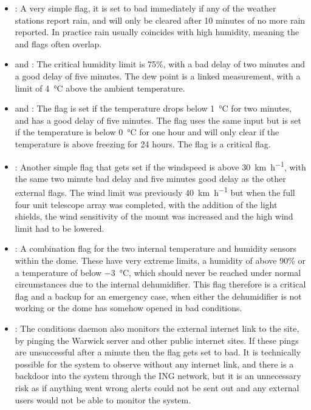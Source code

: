 \begin{colsection}
\begin{colsection}
\begin{itemize}
\item {}: A very simple flag, it is set to bad immediately if any of the weather stations report rain, and will only be cleared after 10 minutes of no more rain reported. In practice rain usually coincides with high humidity, meaning the  and  flags often overlap.

\item {} and : The critical humidity limit is 75\%, with a bad delay of two minutes and a good delay of five minutes. The dew point is a linked measurement, with a limit of \SI{4}{\celsius} above the ambient temperature.

\item {} and : The  flag is set if the temperature drops below \SI{1}{\celsius} for two minutes, and has a good delay of five minutes. The  flag uses the same input but is set if the temperature is below \SI{0}{\celsius} for one hour and will only clear if the temperature is above freezing for 24 hours. The  flag is a critical flag.

\item {}: Another simple flag that gets set if the windspeed is above \SI{30}{\kilo\meter\per\hour}, with the same two minute bad delay and five minutes good delay as the other external flags. The wind limit was previously \SI{40}{\kilo\metre\per\hour} but when the full four unit telescope array was completed, with the addition of the light shields, the wind sensitivity of the mount was increased and the high wind limit had to be lowered.

\item {}: A combination flag for the two internal temperature and humidity sensors within the dome. These have very extreme limits, a humidity of above 90\% or a temperature of below \SI{-3}{\celsius}, which should never be reached under normal circumstances due to the internal dehumidifier. This flag therefore is a critical flag and a backup for an emergency case, when either the dehumidifier is not working or the dome has somehow opened in bad conditions.

\item {}: The conditions daemon also monitors the external internet link to the site, by pinging the Warwick server and other public internet sites. If these pings are unsuccessful after a minute then the  flag gets set to bad. It is technically possible for the system to observe without any internet link, and there is a backdoor into the system through the ING network, but it is an unnecessary risk as if anything went wrong alerts could not be sent out and any external users would not be able to monitor the system.


\end{itemize}
\end{colsection}
\end{colsection}
